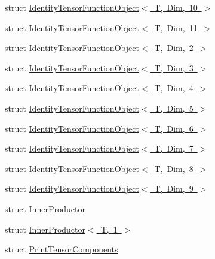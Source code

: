 \begin{DoxyCompactItemize}
\item 
struct \mbox{\hyperlink{structmpc_1_1utilities_1_1_identity_tensor_function_object_3_01_t_00_01_dim_00_0110_01_4}{Identity\+Tensor\+Function\+Object$<$ T, Dim, 10 $>$}}
\item 
struct \mbox{\hyperlink{structmpc_1_1utilities_1_1_identity_tensor_function_object_3_01_t_00_01_dim_00_0111_01_4}{Identity\+Tensor\+Function\+Object$<$ T, Dim, 11 $>$}}
\item 
struct \mbox{\hyperlink{structmpc_1_1utilities_1_1_identity_tensor_function_object_3_01_t_00_01_dim_00_012_01_4}{Identity\+Tensor\+Function\+Object$<$ T, Dim, 2 $>$}}
\item 
struct \mbox{\hyperlink{structmpc_1_1utilities_1_1_identity_tensor_function_object_3_01_t_00_01_dim_00_013_01_4}{Identity\+Tensor\+Function\+Object$<$ T, Dim, 3 $>$}}
\item 
struct \mbox{\hyperlink{structmpc_1_1utilities_1_1_identity_tensor_function_object_3_01_t_00_01_dim_00_014_01_4}{Identity\+Tensor\+Function\+Object$<$ T, Dim, 4 $>$}}
\item 
struct \mbox{\hyperlink{structmpc_1_1utilities_1_1_identity_tensor_function_object_3_01_t_00_01_dim_00_015_01_4}{Identity\+Tensor\+Function\+Object$<$ T, Dim, 5 $>$}}
\item 
struct \mbox{\hyperlink{structmpc_1_1utilities_1_1_identity_tensor_function_object_3_01_t_00_01_dim_00_016_01_4}{Identity\+Tensor\+Function\+Object$<$ T, Dim, 6 $>$}}
\item 
struct \mbox{\hyperlink{structmpc_1_1utilities_1_1_identity_tensor_function_object_3_01_t_00_01_dim_00_017_01_4}{Identity\+Tensor\+Function\+Object$<$ T, Dim, 7 $>$}}
\item 
struct \mbox{\hyperlink{structmpc_1_1utilities_1_1_identity_tensor_function_object_3_01_t_00_01_dim_00_018_01_4}{Identity\+Tensor\+Function\+Object$<$ T, Dim, 8 $>$}}
\item 
struct \mbox{\hyperlink{structmpc_1_1utilities_1_1_identity_tensor_function_object_3_01_t_00_01_dim_00_019_01_4}{Identity\+Tensor\+Function\+Object$<$ T, Dim, 9 $>$}}
\item 
struct \mbox{\hyperlink{structmpc_1_1utilities_1_1_inner_productor}{Inner\+Productor}}
\item 
struct \mbox{\hyperlink{structmpc_1_1utilities_1_1_inner_productor_3_01_t_00_011_01_4}{Inner\+Productor$<$ T, 1 $>$}}
\item 
struct \mbox{\hyperlink{structmpc_1_1utilities_1_1_print_tensor_components}{Print\+Tensor\+Components}}
\item 

\end{DoxyCompactItemize}
